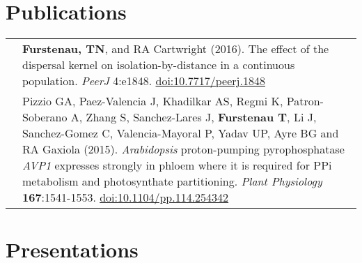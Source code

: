 \documentclass[11pt]{article}
\begin{document}
\section*{Publications}
\renewcommand{\arraystretch}{1.5}
\begin{tabularx}{\linewidth}{l X}
&\textbf{Furstenau, TN}, and RA Cartwright (2016). The effect of the dispersal kernel on isolation-by-distance in a continuous population. \textit{PeerJ} 4:e1848. \href{https://doi.org/10.7717/peerj.1848}{doi:10.7717/peerj.1848}\\

&Pizzio GA, Paez-Valencia J, Khadilkar AS, Regmi K, Patron-Soberano A, Zhang S, Sanchez-Lares J, \textbf{Furstenau T}, Li J, Sanchez-Gomez C, Valencia-Mayoral P, Yadav UP, Ayre BG and RA Gaxiola (2015).\textit{ Arabidopsis} proton-pumping pyrophosphatase \textit{AVP1} expresses strongly in phloem where it is required for PPi metabolism and photosynthate partitioning. \textit{Plant Physiology} \textbf{167}:1541-1553. \href{http:/​/​dx.​doi.​org/​10.​1104/​pp.​114.​254342}{doi:10.1104/pp.114.254342}\\
\end{tabularx}
\section*{Presentations}
\end{document}
